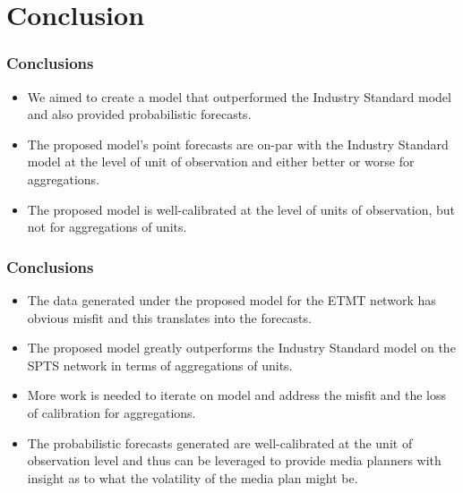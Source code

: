 \documentclass{beamer}
\begin{document}
\section{Conclusion}

\begin{frame}
\frametitle{Conclusions}
\begin{itemize}
  \item We aimed to create a model that outperformed the Industry Standard model and also
    provided probabilistic forecasts.
    \pause
  \item The proposed model's point forecasts are on-par with the Industry Standard model at the level of unit of observation
    and either better or worse for aggregations.
    \pause
  \item The proposed model is well-calibrated at the level of units of observation, but not for aggregations of units.
  \end{itemize}
\end{frame}

\begin{frame}
\frametitle{Conclusions}
\begin{itemize}
  \item The data generated under the proposed model for the ETMT network has obvious misfit and this translates into the forecasts.
    \pause
  \item The proposed model greatly outperforms the Industry Standard model on the SPTS network in terms of aggregations of units.
    \pause
  \item More work is needed to iterate on model and address the misfit and the loss of calibration for aggregations.
    \pause
  \item The probabilistic forecasts generated are well-calibrated at the unit of observation level and thus can
    be leveraged to provide media planners with insight as to what the volatility of the media plan might be.
\end{itemize}
\end{frame}
\end{document}
